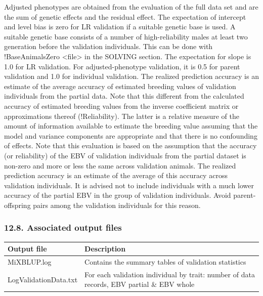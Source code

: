 Adjusted phenotypes are obtained from the evaluation of the full data
set and are the sum of genetic effects and the residual effect. The
expectation of intercept and level bias is zero for LR validation if a
suitable genetic base is used. A suitable genetic base consists of a
number of high-reliability males at least two generation before the
validation individuals. This can be done with !BaseAnimalsZero
\textless file\textgreater{} in the SOLVING section. The expectation for
slope is 1.0 for LR validation. For adjusted-phenotype validation, it is
0.5 for parent validation and 1.0 for individual validation. The
realized prediction accuracy is an estimate of the average accuracy of
estimated breeding values of validation individuals from the partial
data. Note that this different from the calculated accuracy of estimated
breeding values from the inverse coefficient matrix or approximations
thereof (!Reliability). The latter is a relative measure of the amount
of information available to estimate the breeding value assuming that
the model and variance components are appropriate and that there is no
confounding of effects. Note that this evaluation is based on the
assumption that the accuracy (or reliability) of the EBV of validation
individuals from the partial dataset is non-zero and more or less the
same across validation animals. The realized prediction accuracy is an
estimate of the average of this accuracy across validation individuals.
It is advised not to include individuals with a much lower accuracy of
the partial EBV in the group of validation individuals. Avoid
parent-offspring pairs among the validation individuals for this reason.

\subsubsection{12.8. Associated output files}\label{Vali10}

{\def\LTcaptype{none} %
\begin{longtable}[]{@{}
  >{\raggedright\arraybackslash}p{}
  >{\raggedright\arraybackslash}p{}@{}}
\toprule\noalign{}
\begin{minipage}[b]{\linewidth}\raggedright
Output file
\end{minipage} & \begin{minipage}[b]{\linewidth}\raggedright
Description
\end{minipage} \\
\midrule\noalign{}
\endhead
\bottomrule\noalign{}
\endlastfoot
MiXBLUP.log & Contains the summary tables of validation statistics \\
LogValidationData.txt & For each validation individual by trait: number
of data records, EBV partial \& EBV whole \\
\end{longtable}
}

